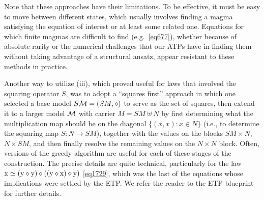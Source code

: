 Note that these approaches have their limitations.  To be effective, it must be easy to move between different
states, which usually involves finding a magma satisfying the equation of interest or at least some related one.
Equations for which finite magmas are difficult to find (e.g.\ \eqref{eq677}), whether because of absolute rarity or the numerical challenges
that our ATPs have in finding them without taking advantage of a structural ansatz, appear resistant to these methods in practice.

Another way to utilize (iii), which proved useful for laws that involved the squaring operator $S$, was to adopt a ``squares first'' approach in which one selected a base model $S{\mathcal{M}} = (SM,\diamond)$ to serve as the set of squares, then extend it to a larger model ${\mathcal{M}}$ with carrier $M = SM \uplus N$ by first determining what the multiplication map should be on the diagonal $\{ (x,x): x\in N\}$ (i.e., to determine the squaring map $S \colon N \to SM$), together with the values on the blocks $SM \times N$, $N \times SM$, and then finally resolve the remaining values on the $N \times N$ block.  Often, versions of the greedy algorithm are useful for each of these stages of the construction.  The precise details are quite technical, particularly for the law $\mathrm{x} \simeq (\mathrm{y} \diamond \mathrm{y}) \diamond ((\mathrm{y} \diamond \mathrm{x}) \diamond \mathrm{y})$ \eqref{eq1729}, which was the last of the equations whose implications were settled by the ETP.  We refer the reader to the ETP blueprint for further details.
